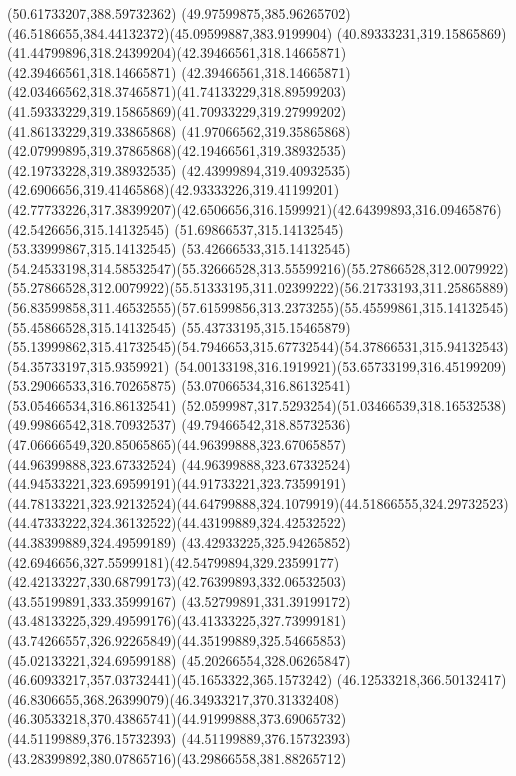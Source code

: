 {{	\lineto(50.61733207,388.59732362)
	\curveto(49.97599875,385.96265702)(46.5186655,384.44132372)(45.09599887,383.9199904)
	\closepath
	\moveto(40.89333231,319.15865869)
	\curveto(41.44799896,318.24399204)(42.39466561,318.14665871)(42.39466561,318.14665871)
	\curveto(42.39466561,318.14665871)(42.03466562,318.37465871)(41.74133229,318.89599203)
	\curveto(41.59333229,319.15865869)(41.70933229,319.27999202)(41.86133229,319.33865868)
	\curveto(41.97066562,319.35865868)(42.07999895,319.37865868)(42.19466561,319.38932535)
	\lineto(42.19733228,319.38932535)
	\curveto(42.43999894,319.40932535)(42.6906656,319.41465868)(42.93333226,319.41199201)
	\curveto(42.77733226,317.38399207)(42.6506656,316.1599921)(42.64399893,316.09465876)
	\lineto(42.5426656,315.14132545)
	\lineto(51.69866537,315.14132545)
	\lineto(53.33999867,315.14132545)
	\lineto(53.42666533,315.14132545)
	\curveto(54.24533198,314.58532547)(55.32666528,313.55599216)(55.27866528,312.0079922)
	\curveto(55.27866528,312.0079922)(55.51333195,311.02399222)(56.21733193,311.25865889)
	\curveto(56.83599858,311.46532555)(57.61599856,313.2373255)(55.45599861,315.14132545)
	\lineto(55.45866528,315.14132545)
	\lineto(55.43733195,315.15465879)
	\curveto(55.13999862,315.41732545)(54.7946653,315.67732544)(54.37866531,315.94132543)
	\lineto(54.35733197,315.9359921)
	\curveto(54.00133198,316.1919921)(53.65733199,316.45199209)(53.29066533,316.70265875)
	\lineto(53.07066534,316.86132541)
	\lineto(53.05466534,316.86132541)
	\curveto(52.0599987,317.5293254)(51.03466539,318.16532538)(49.99866542,318.70932537)
	\curveto(49.79466542,318.85732536)(47.06666549,320.85065865)(44.96399888,323.67065857)
	\lineto(44.96399888,323.67332524)
	\curveto(44.96399888,323.67332524)(44.94533221,323.69599191)(44.91733221,323.73599191)
	\curveto(44.78133221,323.92132524)(44.64799888,324.1079919)(44.51866555,324.29732523)
	\curveto(44.47333222,324.36132522)(44.43199889,324.42532522)(44.38399889,324.49599189)
	\curveto(43.42933225,325.94265852)(42.6946656,327.55999181)(42.54799894,329.23599177)
	\curveto(42.42133227,330.68799173)(42.76399893,332.06532503)(43.55199891,333.35999167)
	\curveto(43.52799891,331.39199172)(43.48133225,329.49599176)(43.41333225,327.73999181)
	\curveto(43.74266557,326.92265849)(44.35199889,325.54665853)(45.02133221,324.69599188)
	\curveto(45.20266554,328.06265847)(46.60933217,357.03732441)(45.1653322,365.1573242)
	\curveto(46.12533218,366.50132417)(46.8306655,368.26399079)(46.34933217,370.31332408)
	\curveto(46.30533218,370.43865741)(44.91999888,373.69065732)(44.51199889,376.15732393)
	\curveto(44.51199889,376.15732393)(43.28399892,380.07865716)(43.29866558,381.88265712)
}}
